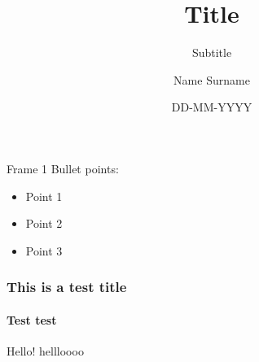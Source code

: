 \documentclass{beamer}
\date{DD-MM-YYYY}
\title{Title}
\subtitle{Subtitle}
\author{Name Surname}
\begin{document}
\begin{frame}[plain]
\maketitle
\end{frame}

\begin{frame}{Frame 1}
Bullet points:

\begin{itemize}
\item Point 1
\item Point 2
\item Point 3
\end{itemize}

\vfill
\end{frame}

\begin{frame}{2}
  \frametitle{This is a test title}
  \framesubtitle{Test test}
  Hello!
  \vfill
  hellloooo
\end{frame}
\end{document}
